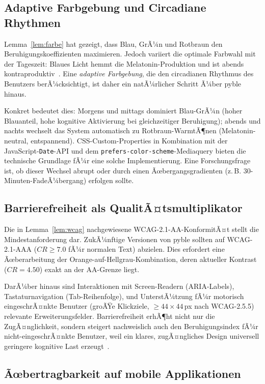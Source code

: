 ﻿\documentclass[a4paper,12pt]{article}
\theoremstyle{definition}
\begin{document}
\subsection{Adaptive Farbgebung und Circadiane Rhythmen}

Lemma~\ref{lem:farbe} hat gezeigt, dass Blau, GrÃ¼n und Rotbraun den
Beruhigungskoeffizienten maximieren. Jedoch variiert die optimale Farbwahl
mit der Tageszeit: Blaues Licht hemmt die Melatonin-Produktion und ist
abends kontraproduktiv~\cite{lockley2006}. Eine \emph{adaptive Farbgebung},
die den circadianen Rhythmus des Benutzers berÃ¼cksichtigt, ist daher
ein natÃ¼rlicher Schritt Ã¼ber pyble hinaus.

Konkret bedeutet dies: Morgens und mittags dominiert Blau-GrÃ¼n (hoher
Blauanteil, hohe kognitive Aktivierung bei gleichzeitiger Beruhigung);
abends und nachts wechselt das System automatisch zu Rotbraun-WarmtÃ¶nen
(Melatonin-neutral, entspannend). CSS-Custom-Properties in Kombination
mit der JavaScript-\texttt{Date}-API und dem \texttt{prefers-color-scheme}-Mediaquery
bieten die technische Grundlage fÃ¼r eine solche Implementierung.
Eine Forschungsfrage ist, ob dieser Wechsel abrupt oder durch einen
Ãœbergangsgradienten (z.\,B. 30-Minuten-FadeÃ¼bergang) erfolgen sollte.

\subsection{Barrierefreiheit als QualitÃ¤tsmultiplikator}

Die in Lemma~\ref{lem:wcag} nachgewiesene WCAG-2.1-AA-KonformitÃ¤t
stellt die Mindestanforderung dar. ZukÃ¼nftige Versionen von pyble sollten
auf WCAG-2.1-AAA ($CR \geq 7.0$ fÃ¼r normalen Text) abzielen. Dies erfordert
eine Ãœberarbeitung der Orange-auf-Hellgrau-Kombination, deren aktueller
Kontrast ($CR = 4.50$) exakt an der AA-Grenze liegt.

DarÃ¼ber hinaus sind Interaktionen mit Screen-Readern (ARIA-Labels),
Tastaturnavigation (Tab-Reihenfolge), und UnterstÃ¼tzung fÃ¼r motorisch
eingeschrÃ¤nkte Benutzer (groÃŸe Klickziele, $\geq 44 \times 44$\,px nach
WCAG-2.5.5) relevante Erweiterungsfelder. Barrierefreiheit erhÃ¶ht nicht
nur die ZugÃ¤nglichkeit, sondern steigert nachweislich auch den
Beruhigungsindex fÃ¼r nicht-eingeschrÃ¤nkte Benutzer, weil ein klares,
zugÃ¤ngliches Design universell geringere kognitive Last erzeugt~\cite{henry2014}.

\subsection{Ãœbertragbarkeit auf mobile Applikationen}
\end{document}
